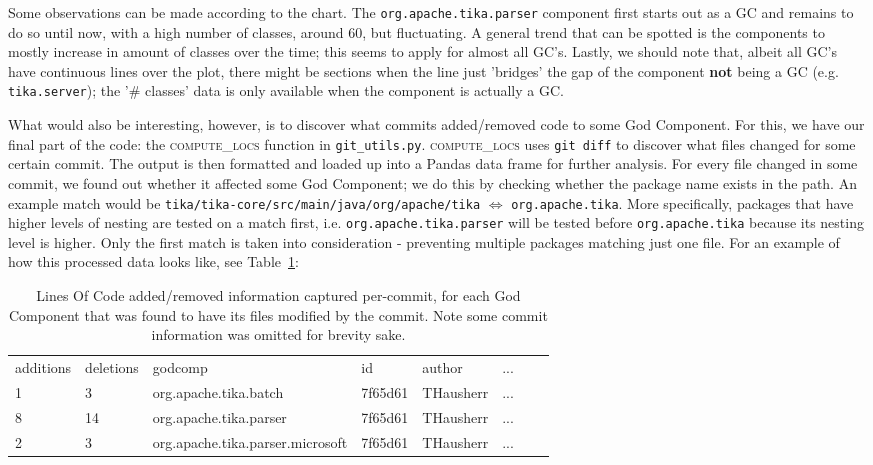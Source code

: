 \documentclass{article}
\begin{document}
Some observations can be made according to the chart. The \texttt{org.apache.tika.parser} component first starts out as a GC and remains to do so until now, with a high number of classes, around 60, but fluctuating. A general trend that can be spotted is the components to mostly increase in amount of classes over the time; this seems to apply for almost all GC's. Lastly, we should note that, albeit all GC's have continuous lines over the plot, there might be sections when the line just 'bridges' the gap of the component \textbf{not} being a GC (e.g. \texttt{tika.server}); the '\# classes' data is only available when the component is actually a GC. 

What would also be interesting, however, is to discover what commits added/removed code to some God Component. For this, we have our final part of the code: the \textsc{compute\_locs} function in \texttt{git\_utils.py}. \textsc{compute\_locs} uses \texttt{git diff} to discover what files changed for some certain commit. The output is then formatted and loaded up into a Pandas data frame for further analysis. For every file changed in some commit, we found out whether it affected some God Component; we do this by checking whether the package name exists in the path. An example match would be \texttt{tika/tika-core/src/main/java/org/apache/tika} $\Leftrightarrow$ \texttt{org.apache.tika}. More specifically, packages that have higher levels of nesting are tested on a match first, i.e. \texttt{org.apache.tika.parser} will be tested before \texttt{org.apache.tika} because its nesting level is higher. Only the first match is taken into consideration - preventing multiple packages matching just one file. For an example of how this processed data looks like, see Table~\ref{tab:locs}:

\begin{table}[H]
\begin{tabular}{llllllll}
additions & deletions & godcomp                          & id                                       & author    & ...\\
1         & 3         & org.apache.tika.batch            & 7f65d61 & THausherr & ... \\
8         & 14        & org.apache.tika.parser           & 7f65d61 & THausherr & ... \\
2         & 3         & org.apache.tika.parser.microsoft & 7f65d61 & THausherr & ... \\
\end{tabular}
\caption{Lines Of Code added/removed information captured per-commit, for each God Component that was found to have its files modified by the commit. Note some commit information was omitted for brevity sake.}
\label{tab:locs}
\end{table}
\end{document}
